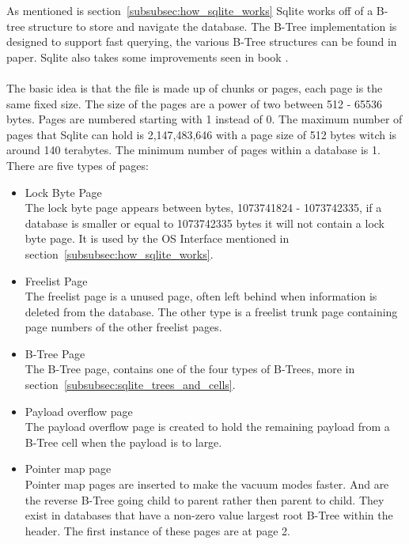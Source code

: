As mentioned is section~\ref{subsubsec:how_sqlite_works} Sqlite works off of a B-tree structure to store and navigate the database. The B-Tree implementation is designed to support fast querying, the various B-Tree structures can be found in \cite{btreepaper} paper. Sqlite also takes some improvements seen in \cite{btreeimprpaper} book \citep{sqliteray}.
\\\\
The basic idea is that the file is made up of chunks or pages, each page is the same fixed size. The size of the pages are a power of two between 512 - 65536 bytes. Pages are numbered starting with 1 instead of 0. The maximum number of pages that Sqlite can hold is 2,147,483,646 with a page size of 512 bytes witch is around 140 terabytes. The minimum number of pages within a database is 1. There are five types of pages:

\begin{itemize} 
	\item Lock Byte Page \hfill \\
		The lock byte page appears between bytes, 1073741824 - 1073742335, if a database is smaller or equal to 1073742335 bytes it will not contain a lock byte page. It is used by the OS Interface mentioned in section~\ref{subsubsec:how_sqlite_works}.
	
	\item Freelist Page \hfill \\
		The freelist page is a unused page, often left behind when information is deleted from the database. The other type is a freelist trunk page containing page numbers of the other freelist pages.
	
	\item B-Tree Page \hfill \\
		The B-Tree page, contains one of the four types of B-Trees, more in section~\ref{subsubsec:sqlite_trees_and_cells}.
	
	\item Payload overflow page \hfill \\
		The payload overflow page is created to hold the remaining payload from a B-Tree cell when the payload is to large.
	
	\item Pointer map page \hfill \\
		Pointer map pages are inserted to make the vacuum modes faster. And are the reverse B-Tree going child to parent rather then parent to child. They exist in databases that have a non-zero value largest root B-Tree within the header. The first instance of these pages are at page 2. 
\end{itemize} 


